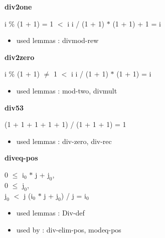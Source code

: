 \documentclass[a4paper]{article}
\begin{document}
\medskip

\bigskip

{\large\bf div2one}

\medskip

 \Fol i \% (1 + 1) = 1  $<$ i \Imp i / (1 + 1) $*$ (1 + 1) + 1 = i

\begin{itemize}


\item       used lemmas  : divmod-rew

\end{itemize}

\medskip

\bigskip

{\large\bf div2zero}

\medskip

 \Fol i \% (1 + 1) $\neq$ 1  $<$ i \Imp i / (1 + 1) $*$ (1 + 1) = i

\begin{itemize}


\item       used lemmas  : mod-two, divmult

\end{itemize}

\medskip

\bigskip

{\large\bf div53}

\medskip

 \Fol (1 + 1 + 1 + 1 + 1) / (1 + 1 + 1) = 1

\begin{itemize}


\item       used lemmas  : div-zero, div-rec

\end{itemize}

\medskip

\bigskip

{\large\bf diveq-pos}

\medskip

0 $\le$ $\mbox{i}_{0}$ $*$ j + $\mbox{j}_{0}$, \\
0 $\le$ $\mbox{j}_{0}$, \\
$\mbox{j}_{0}$ $<$ j \Fol ($\mbox{i}_{0}$ $*$ j + $\mbox{j}_{0}$) / j = $\mbox{i}_{0}$

\begin{itemize}


\item       used lemmas  : Div-def
\item       used by      : div-elim-pos, modeq-pos

\end{itemize}
\end{document}
